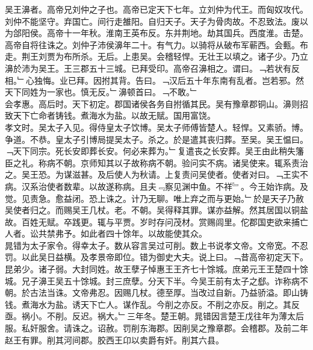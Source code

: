 \documentclass{zhvt-classic}
\begin{document}

\hspace*{2em}吴王濞者。高帝兄刘仲之子也。高帝已定天下七年。立刘仲为代王。而匈奴攻代。刘仲不能坚守。弃国亡。间行走雒阳。自归天子。天子为骨肉故。不忍致法。废以为郃阳侯。高帝十一年秋。淮南王英布反。东并荆地。劫其国兵。西度淮。击楚。高帝自将往诛之。刘仲子沛侯濞年二十。有气力。以骑将从破布军蕲西。会甀。布走。荆王刘贾为布所杀。无后。上患吴。会稽轻悍。无壮王以填之。诸子少。乃立濞於沛为吴王。王三郡五十三城。已拜受印。高帝召濞相之。谓曰。﹁若状有反相。﹂心独悔。业已拜。因拊其背。告曰。﹁汉后五十年东南有乱者。岂若邪。然天下同姓为一家也。慎无反。﹂濞顿首曰。﹁不敢。﹂\\
\hspace*{2em}会孝惠。高后时。天下初定。郡国诸侯各务自拊循其民。吴有豫章郡铜山。濞则招致天下亡命者铸钱。煮海水为盐。以故无赋。国用富饶。\\
\hspace*{2em}孝文时。吴太子入见。得侍皇太子饮博。吴太子师傅皆楚人。轻悍。又素骄。博。争道。不恭。皇太子引博局提吴太子。杀之。於是遣其丧归葬。至吴。吴王愠曰。﹁天下同宗。死长安即葬长安。何必来葬为。﹂复遣丧之长安葬。吴王由此稍失籓臣之礼。称病不朝。京师知其以子故称病不朝。验问实不病。诸吴使来。辄系责治之。吴王恐。为谋滋甚。及后使人为秋请。上复责问吴使者。使者对曰。﹁王实不病。汉系治使者数辈。以故遂称病。且夫﹃察见渊中鱼。不祥﹄。今王始诈病。及觉。见责急。愈益闭。恐上诛之。计乃无聊。唯上弃之而与更始。﹂於是天子乃赦吴使者归之。而赐吴王几杖。老。不朝。吴得释其罪。谋亦益解。然其居国以铜盐故。百姓无赋。卒践更。辄与平贾。岁时存问茂材。赏赐闾里。佗郡国吏欲来捕亡人者。讼共禁弗予。如此者四十馀年。以故能使其众。\\
\hspace*{2em}晁错为太子家令。得幸太子。数从容言吴过可削。数上书说孝文帝。文帝宽。不忍罚。以此吴日益横。及孝景帝即位。错为御史大夫。说上曰。﹁昔高帝初定天下。昆弟少。诸子弱。大封同姓。故王孽子悼惠王王齐七十馀城。庶弟元王王楚四十馀城。兄子濞王吴五十馀城。封三庶孽。分天下半。今吴王前有太子之郄。诈称病不朝。於古法当诛。文帝弗忍。因赐几杖。德至厚。当改过自新。乃益骄溢。即山铸钱。煮海水为盐。诱天下亡人。谋作乱。今削之亦反。不削之亦反。削之。其反亟。祸小。不削。反迟。祸大。﹂三年冬。楚王朝。晁错因言楚王戊往年为薄太后服。私奸服舍。请诛之。诏赦。罚削东海郡。因削吴之豫章郡。会稽郡。及前二年赵王有罪。削其河间郡。胶西王卬以卖爵有奸。削其六县。\\
\end{document}
